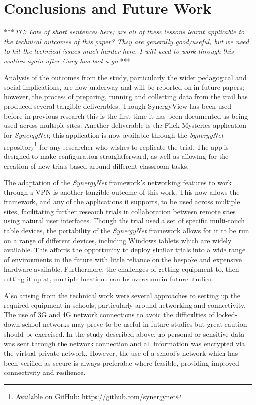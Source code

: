 \documentclass[a4paper,11pt]{article}
\begin{document}
\section{Conclusions and Future Work}

***{\emph{TC: Lots of short sentences here; are all of these lessons learnt applicable to the technical outcomes of this paper? They are generally good/useful, but we need to hit the technical issues much harder here. I will need to work through this section again after Gary has had a go.}}***

Analysis of the outcomes from the study, particularly the wider pedagogical and social implications, are now underway and will be reported on in future papers; however, the process of preparing, running and collecting data from the trail has produced several tangible deliverables.
Though SynergyView has been used before in previous research this is the first time it has been documented as being used across multiple sites.
Another deliverable is the Flick Mysteries application for {\emph{SynergyNet}}; this application is now available through the {\emph{SynergyNet}} repository\footnote{Available on GitHub: \url{https://github.com/synergynet}} for any researcher who wishes to replicate the trial.
The app is designed to make configuration straightforward, as well as allowing for the creation of new trials based around different classroom tasks.

The adaptation of the {\emph{SynergyNet}} framework's networking features to work through a VPN is another tangible outcome of this work.
This now allows the framework, and any of the applications it supports, to be used across multiple sites, facilitating further research trials in collaboration between remote sites using natural user interfaces.
Though the trial used a set of specific multi-touch table devices, the portability of the {\emph{SynergyNet}} framework allows for it to be run on a range of different devices, including Windows tablets which are widely available.
This affords the opportunity to deploy similar trials into a wide range of environments in the future with little reliance on the bespoke and expensive hardware available.
Furthermore, the challenges of getting equipment to, then setting it up at, multiple locations can be overcome in future studies.

Also arising from the technical work were several approaches to setting up the required equipment in schools, particularly around networking and connectivity.
The use of 3G and 4G network connections to avoid the difficulties of locked-down school networks may prove to be useful in future studies but great caution should be exercised.
In the study described above, no personal or sensitive data was sent through the network connection and all information was encrypted via the virtual private network.
However, the use of a school's network which has been verified as secure is always preferable where feasible, providing improved connectivity and resilience.
\end{document}
